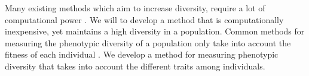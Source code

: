 Many existing methods which aim to increase diversity, require a lot of computational power \citpls{}. We will to develop a method that is computationally inexpensive, yet maintains a high diversity in a population. Common methods for measuring the phenotypic diversity of a population only take into account the fitness of each individual \citpls{}. We develop a method for measuring phenotypic diversity that takes into account the different traits among individuals. 
